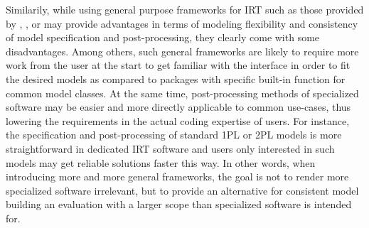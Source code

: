 \documentclass[jss]{jss}
\begin{document}
Similarily, while using general purpose frameworks for IRT such as those
provided by , , or  may provide
advantages in terms of modeling flexibility and consistency of model
specification and post-processing, they clearly come with some
disadvantages. Among others, such general frameworks are likely to
require more work from the user at the start to get familiar with the
interface in order to fit the desired models as compared to packages
with specific built-in function for common model classes. At the same
time, post-processing methods of specialized software may be easier and
more directly applicable to common use-cases, thus lowering the
requirements in the actual coding expertise of users. For instance, the
specification and post-processing of standard 1PL or 2PL models is more
straightforward in dedicated IRT software and users only interested in
such models may get reliable solutions faster this way. In other words,
when introducing more and more general frameworks, the goal is not to
render more specialized software irrelevant, but to provide an
alternative for consistent model building an evaluation with a larger
scope than specialized software is intended for.
\end{document}
